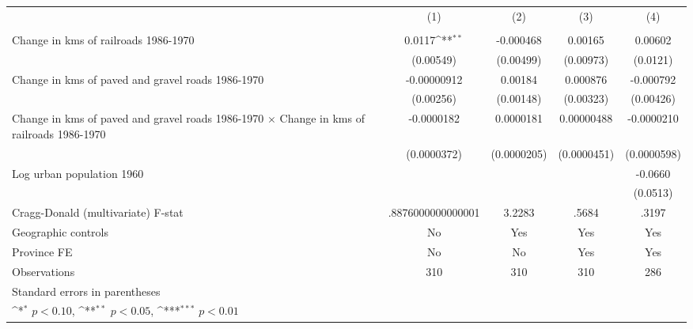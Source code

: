 {
\def\sym#1{\ifmmode^{#1}\else\(^{#1}\)\fi}
\begin{tabular}{l*{4}{c}}
\hline\hline
                &\multicolumn{1}{c}{(1)}&\multicolumn{1}{c}{(2)}&\multicolumn{1}{c}{(3)}&\multicolumn{1}{c}{(4)}\\
                &\multicolumn{1}{c}{}&\multicolumn{1}{c}{}&\multicolumn{1}{c}{}&\multicolumn{1}{c}{}\\
\hline
Change in kms of railroads 1986-1970&   0.0117\sym{**} &-0.000468         &  0.00165         &  0.00602         \\
                &(0.00549)         &(0.00499)         &(0.00973)         & (0.0121)         \\
[1em]
Change in kms of paved and gravel roads 1986-1970&-0.00000912         &  0.00184         & 0.000876         &-0.000792         \\
                &(0.00256)         &(0.00148)         &(0.00323)         &(0.00426)         \\
[1em]
Change in kms of paved and gravel roads 1986-1970 $\times$ Change in kms of railroads 1986-1970&-0.0000182         &0.0000181         &0.00000488         &-0.0000210         \\
                &(0.0000372)         &(0.0000205)         &(0.0000451)         &(0.0000598)         \\
[1em]
Log urban population 1960&                  &                  &                  &  -0.0660         \\
                &                  &                  &                  & (0.0513)         \\
\hline
Cragg-Donald (multivariate) F-stat&.8876000000000001         &   3.2283         &    .5684         &    .3197         \\
Geographic controls&       No         &      Yes         &      Yes         &      Yes         \\
Province FE     &       No         &       No         &      Yes         &      Yes         \\
Observations    &      310         &      310         &      310         &      286         \\
\hline\hline
\multicolumn{5}{l}{\footnotesize Standard errors in parentheses}\\
\multicolumn{5}{l}{\footnotesize \sym{*} \(p<0.10\), \sym{**} \(p<0.05\), \sym{***} \(p<0.01\)}\\
\end{tabular}
}
